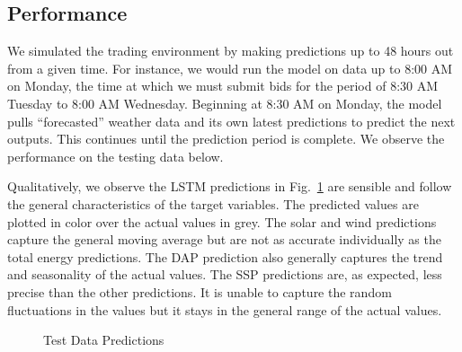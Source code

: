 \documentclass[
  journal,
]{IEEEtran}%
\begin{document}
\subsection{Performance}\label{performance}

We simulated the trading environment by making predictions up to 48
hours out from a given time. For instance, we would run the model on
data up to 8:00 AM on Monday, the time at which we must submit bids for
the period of 8:30 AM Tuesday to 8:00 AM Wednesday. Beginning at 8:30 AM
on Monday, the model pulls ``forecasted'' weather data and its own
latest predictions to predict the next outputs. This continues until the
prediction period is complete. We observe the performance on the testing
data below.

Qualitatively, we observe the LSTM predictions in
Fig.~\ref{fig-predictions} are sensible and follow the general
characteristics of the target variables. The predicted values are
plotted in color over the actual values in grey. The solar and wind
predictions capture the general moving average but are not as accurate
individually as the total energy predictions. The DAP prediction also
generally captures the trend and seasonality of the actual values. The
SSP predictions are, as expected, less precise than the other
predictions. It is unable to capture the random fluctuations in the
values but it stays in the general range of the actual values.

\begin{figure}


\caption{\label{fig-predictions}Test Data Predictions}

\end{figure}%
\end{document}
